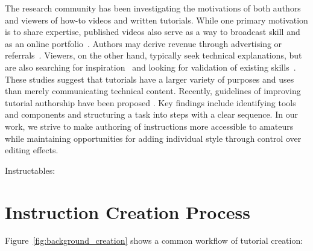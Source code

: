 The research community has been investigating the motivations of both authors and viewers of how-to videos and written tutorials. While one primary motivation is to share expertise, published videos also serve as a way to broadcast skill and as an online portfolio~\cite{Torrey:2007he,Kuznetsov:2010:REA:1868914.1868950}. Authors may derive revenue through advertising or referrals~\cite{Lafreniere:2012tl}. Viewers, on the other hand, typically seek technical explanations, but are also searching for inspiration~\cite{Torrey:2009fc} and looking for validation of existing skills~\cite{Lafreniere:2012tl}.
%
These studies suggest that tutorials have a larger variety of purposes and uses than merely communicating technical content. Recently, guidelines of improving tutorial authorship have been proposed \cite{Wakkary:2015:TAH:2702123.2702550}. Key findings include identifying tools and components and structuring a task into steps with a clear sequence. In our work, we strive to make authoring of instructions more accessible to amateurs while maintaining opportunities for adding individual style through control over editing effects.

Instructables: \cite{Tseng:2014:PVP:2598510.2598540}



\section{Instruction Creation Process}
\label{background_creation}


Figure~\ref{fig:background_creation} shows a common workflow of tutorial creation:


